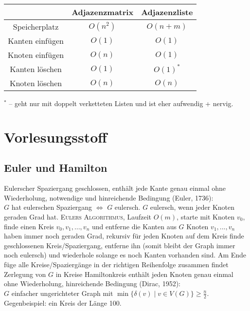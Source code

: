 \begin{center}
\begin{tabular}{ c c c } 
    & Adjazenzmatrix & Adjazenzliste \\
    \hline
    Speicherplatz & $O(n^2)$ & $O(n+m)$ \\ 
    Kanten einfügen & $O(1)$ & $O(1)$ \\ 
    Knoten einfügen & $O(n)$ & $O(1)$ \\
    Kanten löschen  & $O(1)$ & $O(1)^*$\\
    Knoten löschen  & $O(n)$ & $O(n)$ \\
    \end{tabular}
\end{center}
$^*$ -- geht nur mit doppelt verketteten Listen und ist eher aufwendig + nervig.

\section{Vorlesungsstoff}
\subsection{Euler und Hamilton}
\begin{outline}
    \1 Eulerscher Spaziergang 
        \2 geschlossen, enthält jede Kante genau einmal ohne Wiederholung,
        \2 notwendige und hinreichende Bedingung (Euler, 1736):\\
        $G$ hat eulerschen Spaziergang $\iff$ $G$ eulersch.
            \3 $G$ eulersch, wenn jeder Knoten geraden Grad hat.
        \2 \textsc{Eulers Algorithmus}, Laufzeit $O(m)$,
            \3 starte mit Knoten $v_0$, finde einen Kreis $v_0,v_1,\ldots,v_n$ und entferne die Kanten aus $G$
            \3 Knoten $v_1, ... , v_n$ haben immer noch geraden Grad, rekursiv für jeden Knoten auf dem Kreis finde geschlossenen Kreis/Spaziergang, entferne ihn (somit bleibt der Graph immer noch eulersch) und wiederhole solange es noch Kanten vorhanden sind. Am Ende füge alle Kreise/Spaziergänge in der richtigen Reihenfolge zusammen
            \3 findet Zerlegung von $G$ in Kreise
    \1 Hamiltonkreis
        \2 enthält jeden Knoten genau einmal ohne Wiederholung,
        \2 hinreichende Bedingung (Dirac, 1952):\\
        $G$ einfacher ungerichteter Graph mit $\min \{\delta(v) \mid v \in V(G)\} \geq \frac{n}{2}$.\\
        Gegenbeispiel: ein Kreis der Länge 100.
\end{outline}
